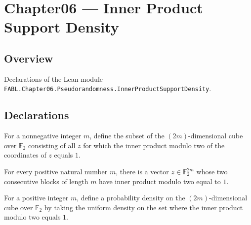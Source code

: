 \chapter{Chapter06 — Inner Product Support Density}
\section{Overview}

Declarations of the Lean module \texttt{FABL.Chapter06.Pseudorandomness.InnerProductSupportDensity}.

\section{Declarations}

\begin{definition}
\label{FABL.innerProductModTwoOneSet}
\leanok
{}
For a nonnegative integer $m$, define the subset of the $(2m)$-dimensional cube over
$\mathbb{F}_2$ consisting of all $z$ for which the inner product modulo two of the
coordinates of $z$ equals $1$.
\end{definition}

\begin{theorem}
\label{FABL.innerProductModTwoOneSet_nonempty}
\leanok
{}
For every positive natural number $m$, there is a vector $z\in\mathbb{F}_2^{2m}$ whose
two consecutive blocks of length $m$ have inner product modulo two equal to $1$.
\end{theorem}

\begin{definition}
\label{FABL.innerProductModTwoSupportDensity}
\leanok
{}
For a positive integer $m$, define a probability density on the $(2m)$-dimensional cube
over $\mathbb{F}_2$ by taking the uniform density on the set where the inner product
modulo two equals $1$.
\end{definition}

